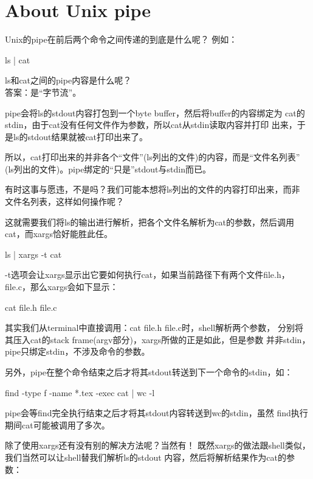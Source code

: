 ﻿\documentclass[a4paper,11pt]{article}
\begin{document}
  \section[About Unix Pipe]{About Unix pipe}
  Unix的pipe在前后两个命令之间传递的到底是什么呢？
  例如：

  \begin{bashcode}
    ls | cat
  \end{bashcode}

  ls和cat之间的pipe内容是什么呢？\\
  答案：是“字节流”。

  pipe会将ls的stdout内容打包到一个byte buffer，然后将buffer的内容绑定为
  cat的stdin，由于cat没有任何文件作为参数，所以cat从stdin读取内容并打印
  出来，于是ls的stdout结果就被cat打印出来了。

  所以，cat打印出来的并非各个“文件”(ls列出的文件)的内容，而是“文件名列表”
  (ls列出的文件)。pipe绑定的“只是”stdout与stdin而已。

  有时这事与愿违，不是吗？我们可能本想将ls列出的文件的内容打印出来，而非
  文件名列表，这样如何操作呢？

  这就需要我们将ls的输出进行解析，把各个文件名解析为cat的参数，然后调用
  cat，而xargs恰好能胜此任。

  \begin{bashcode}
    ls | xargs -t cat
  \end{bashcode}

  -t选项会让xargs显示出它要如何执行cat，如果当前路径下有两个文件file.h，
  file.c，那么xargs会如下显示：

  \begin{bashcode}
    cat file.h file.c
  \end{bashcode}

  其实我们从terminal中直接调用：cat file.h file.c时，shell解析两个参数，
  分别将其压入cat的stack frame(argv部分)，xargs所做的正是如此，但是参数
  并非stdin，pipe只绑定stdin，不涉及命令的参数。

  另外，pipe在整个命令结束之后才将其stdout转送到下一个命令的stdin，如：

  \begin{bashcode}
    find -type f -name *.tex -exec cat {} \; | wc -l
  \end{bashcode}

  pipe会等find完全执行结束之后才将其stdout内容转送到wc的stdin，虽然
  find执行期间cat可能被调用了多次。


  除了使用xargs还有没有别的解决方法呢？当然有！
  既然xargs的做法跟shell类似，我们当然可以让shell替我们解析ls的stdout
  内容，然后将解析结果作为cat的参数：
\end{document}
